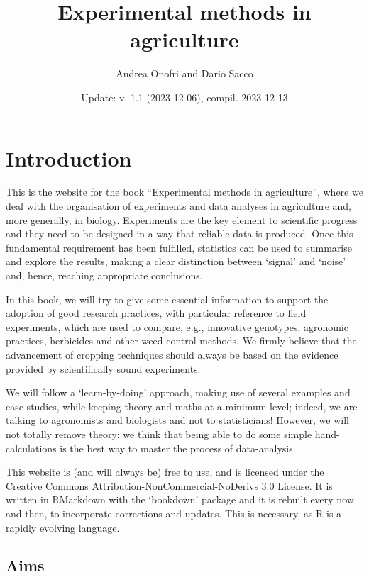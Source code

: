 \documentclass[a4paper,12pt,oneside]{book}
\author{Andrea Onofri and Dario Sacco}
\date{Update: v. 1.1 (2023-12-06), compil. 2023-12-13}
\title{Experimental methods in agriculture}
\subtitle{}
\begin{document}
\maketitle
\tableofcontents

\hypertarget{introduction}{%
\chapter*{Introduction}\label{introduction}}

This is the website for the book ``Experimental methods in agriculture'', where we deal with the organisation of experiments and data analyses in agriculture and, more generally, in biology. Experiments are the key element to scientific progress and they need to be designed in a way that reliable data is produced. Once this fundamental requirement has been fulfilled, statistics can be used to summarise and explore the results, making a clear distinction between `signal' and `noise' and, hence, reaching appropriate conclusions.

In this book, we will try to give some essential information to support the adoption of good research practices, with particular reference to field experiments, which are used to compare, e.g., innovative genotypes, agronomic practices, herbicides and other weed control methods. We firmly believe that the advancement of cropping techniques should always be based on the evidence provided by scientifically sound experiments.

We will follow a `learn-by-doing' approach, making use of several examples and case studies, while keeping theory and maths at a minimum level; indeed, we are talking to agronomists and biologists and not to statisticians! However, we will not totally remove theory: we think that being able to do some simple hand-calculations is the best way to master the process of data-analysis.

This website is (and will always be) free to use, and is licensed under the Creative Commons Attribution-NonCommercial-NoDerivs 3.0 License. It is written in RMarkdown with the `bookdown' package and it is rebuilt every now and then, to incorporate corrections and updates. This is necessary, as R is a rapidly evolving language.

\hypertarget{aims}{%
\section*{Aims}\label{aims}}
\end{document}
